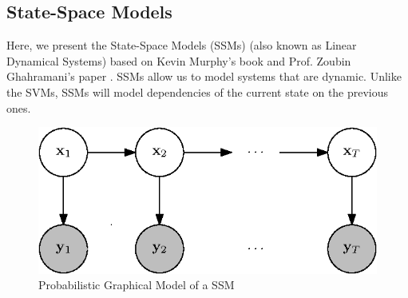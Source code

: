 \subsection{State-Space Models}

	Here, we present the State-Space Models (SSMs) (also known as Linear Dynamical Systems) based on Kevin Murphy's book \cite[Chapter 18]{mlBook} and Prof. Zoubin Ghahramani's paper \cite{ghahramani2000variational}. SSMs allow us to model systems that are dynamic. Unlike the SVMs, SSMs will model dependencies of the current state on the previous ones.
	
	\begin{figure}[h!]
		\centering
			\includegraphics{drawings/pgm.eps}
		\caption{Probabilistic Graphical Model of a SSM}
		\label{fig:pgm}
	\end{figure}
	
